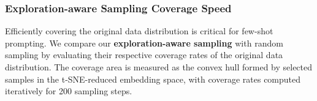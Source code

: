 
\subsubsection{Exploration-aware Sampling Coverage Speed}
\label{sec:abla_coverage}


Efficiently covering the original data distribution is critical for few-shot prompting. We compare our \textbf{exploration-aware sampling} with random sampling by evaluating their respective coverage rates of the original data distribution. The coverage area is measured as the convex hull formed by selected samples in the t-SNE-reduced embedding space, with coverage rates computed iteratively for 200 sampling steps.


